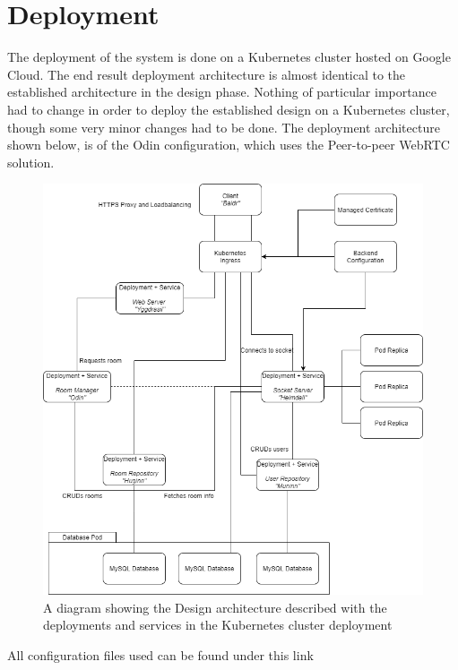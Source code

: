 \chapter{Deployment}

The deployment of the system is done on a Kubernetes cluster hosted on Google Cloud. The end result deployment architecture is almost identical to the established architecture in the design phase. Nothing of particular importance had to change in order to deploy the established design on a Kubernetes cluster, though some very minor changes had to be done. The deployment architecture shown below, is of the Odin configuration, which uses the Peer-to-peer WebRTC solution. 

\begin{figure}[ht]
    \centering
    \includegraphics[width=\textwidth]{Pictures/Odin Kubernetes Deployment (2).png}
    \caption{A diagram showing the Design architecture described with the deployments and services in the Kubernetes cluster deployment }
    \label{fig:gantt}
\end{figure}

All configuration files used can be found under this link \cite{kubernetes-settings}



